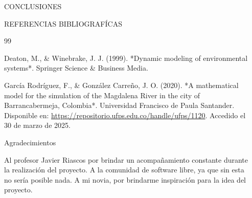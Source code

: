 \documentclass[final]{beamer}
\newlength{\sepwidth}
\newlength{\colwidth}
\newcommand{\separatorcolumn}{\begin{column}{\sepwidth}\end{column}}
\begin{document}
\begin{frame}[t]
\begin{columns}[t]
\begin{column}{\colwidth}
\begin{block}{CONCLUSIONES}
  \end{block}

  \begin{block}{REFERENCIAS BIBLIOGRAFÍCAS}

    \begin{thebibliography}{99}

Deaton, M., \& Winebrake, J. J. (1999). *Dynamic modeling of environmental systems*. Springer Science \& Business Media.

García Rodríguez, F., \& González Carreño, J. O. (2020). *A mathematical model for the simulation of the Magdalena River in the city of Barrancabermeja, Colombia*. Universidad Francisco de Paula Santander. Disponible en: \url{https://repositorio.ufps.edu.co/handle/ufps/1120}. Accedido el 30 de marzo de 2025.
\end{thebibliography}


  \end{block}

    \begin{block}{Agradecimientos}

    Al profesor Javier Riascos por brindar un acompañamiento constante durante la realización del proyecto. A la comunidad de software libre, ya que sin esta no sería posible nada. A mi novia, por brindarme inspiración para la idea del proyecto.

  \end{block}

\end{column}
\separatorcolumn



\end{columns}
\end{frame}
\end{document}
